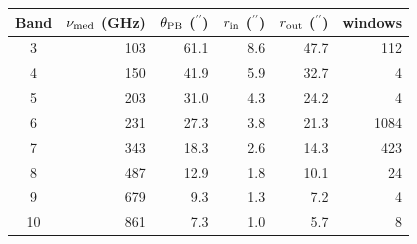 \begin{tabular}{@{}crrrrr@{}}
\toprule
Band & $\nu_{\rm med}$ (GHz) & $\theta_{\rm PB}$ ($^{\prime\prime}$) & $r_{\rm in}$ ($^{\prime\prime}$) & $r_{\rm out}$ ($^{\prime\prime}$) & windows \\
\midrule
3 & 103 & 61.1 & 8.6 & 47.7 & 112 \\
4 & 150 & 41.9 & 5.9 & 32.7 & 4 \\
5 & 203 & 31.0 & 4.3 & 24.2 & 4 \\
6 & 231 & 27.3 & 3.8 & 21.3 & 1084 \\
7 & 343 & 18.3 & 2.6 & 14.3 & 423 \\
8 & 487 & 12.9 & 1.8 & 10.1 & 24 \\
9 & 679 & 9.3 & 1.3 & 7.2 & 4 \\
10 & 861 & 7.3 & 1.0 & 5.7 & 8 \\
\bottomrule
\end{tabular}
